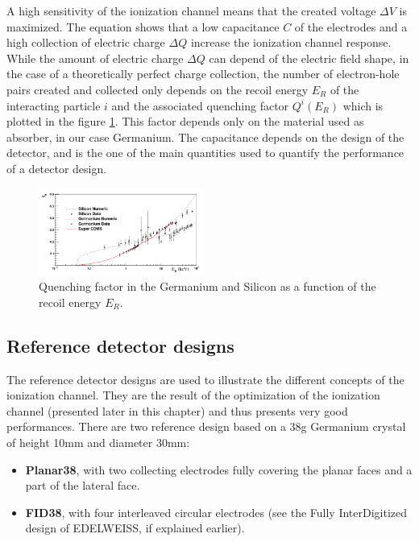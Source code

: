 A high sensitivity of the ionization channel means that the created voltage $\Delta V$ is maximized. The equation \label{eq:capacitor-basic} shows that a low capacitance $C$ of the electrodes and a high collection of electric charge $\Delta Q$ increase the ionization channel response. While the amount of electric charge $\Delta Q$ can depend of the electric field shape, in the case of a theoretically perfect charge collection, the number of electron-hole pairs created and collected only depends on the recoil energy $E_R$ of the interacting particle $i$ and the associated quenching factor $Q^i(E_R)$ which is plotted in the figure \ref{fig:quenching-germanium}. This factor depends only on the material used as absorber, in our case Germanium.
The capacitance depends on the design of the detector, and is the one of the main quantities used to quantify the performance of a detector design.

\begin{figure}
\centering
\includegraphics[width=0.48\textwidth]{Figures/Electrodes/quenching_germanium.png}
\caption{Quenching factor in the Germanium and Silicon as a function of the recoil energy $E_R$.}
\label{fig:quenching-germanium}
\end{figure}

\subsection{Reference detector designs}

The reference detector designs are used to illustrate the different concepts of the ionization channel. They are the result of the optimization of the ionization channel (presented later in this chapter) and thus presents very good performances. There are two reference design based on a 38g Germanium crystal of height 10mm and diameter 30mm: 

\begin{itemize}
	\item \textbf{Planar38}, with two collecting electrodes fully covering the planar faces and a part of the lateral face.
	\item \textbf{FID38}, with four interleaved circular electrodes (see the Fully InterDigitized design of EDELWEISS, if explained earlier). 
\end{itemize}


